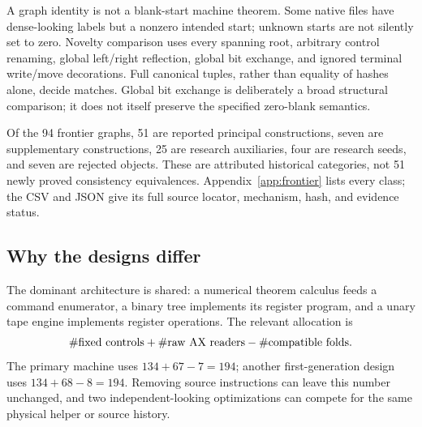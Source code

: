 \documentclass[11pt]{article}
\theoremstyle{definition}\newtheorem{definition}[theorem]{Definition}
\begin{document}
A graph identity is not a blank-start machine theorem. Some native files
have dense-looking labels but a nonzero intended start; unknown starts
are not silently set to zero. Novelty comparison uses every spanning
root, arbitrary control renaming, global left/right reflection, global
bit exchange, and ignored terminal write/move decorations. Full canonical
tuples, rather than equality of hashes alone, decide matches. Global bit
exchange is deliberately a broad structural comparison; it does not itself
preserve the specified zero-blank semantics.

Of the 94 frontier graphs, 51 are reported principal constructions, seven
are supplementary constructions, 25 are research auxiliaries, four are
research seeds, and seven are rejected objects. These are attributed
historical categories, not 51 newly proved consistency equivalences.
Appendix~\ref{app:frontier} lists every class; the CSV and JSON give its
full source locator, mechanism, hash, and evidence status.

\subsection{Why the designs differ}

The dominant architecture is shared: a numerical theorem calculus feeds
a command enumerator, a binary tree implements its register program,
and a unary tape engine implements register operations. The relevant
allocation is
\[
 \#\hbox{fixed controls}+\#\hbox{raw AX readers}
       -\#\hbox{compatible folds}.
\]
The primary machine uses $134+67-7=194$; another first-generation design
uses $134+68-8=194$. Removing source instructions can leave this number
unchanged, and two independent-looking optimizations can compete for
the same physical helper or source history.
\end{document}
